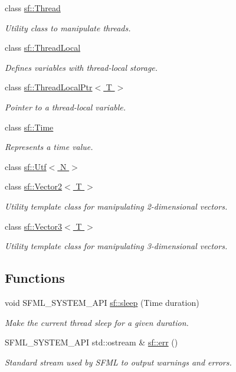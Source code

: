 \begin{DoxyCompactItemize}
class \hyperlink{classsf_1_1Thread}{sf\-::\-Thread}
\begin{DoxyCompactList}\small\item\em Utility class to manipulate threads. \end{DoxyCompactList}\item 
class \hyperlink{classsf_1_1ThreadLocal}{sf\-::\-Thread\-Local}
\begin{DoxyCompactList}\small\item\em Defines variables with thread-\/local storage. \end{DoxyCompactList}\item 
class \hyperlink{classsf_1_1ThreadLocalPtr}{sf\-::\-Thread\-Local\-Ptr$<$ T $>$}
\begin{DoxyCompactList}\small\item\em Pointer to a thread-\/local variable. \end{DoxyCompactList}\item 
class \hyperlink{classsf_1_1Time}{sf\-::\-Time}
\begin{DoxyCompactList}\small\item\em Represents a time value. \end{DoxyCompactList}\item 
class \hyperlink{classsf_1_1Utf}{sf\-::\-Utf$<$ N $>$}
\item 
class \hyperlink{classsf_1_1Vector2}{sf\-::\-Vector2$<$ T $>$}
\begin{DoxyCompactList}\small\item\em Utility template class for manipulating 2-\/dimensional vectors. \end{DoxyCompactList}\item 
class \hyperlink{classsf_1_1Vector3}{sf\-::\-Vector3$<$ T $>$}
\begin{DoxyCompactList}\small\item\em Utility template class for manipulating 3-\/dimensional vectors. \end{DoxyCompactList}\end{DoxyCompactItemize}
\subsection*{Functions}
\begin{DoxyCompactItemize}
\item 
void S\-F\-M\-L\-\_\-\-S\-Y\-S\-T\-E\-M\-\_\-\-A\-P\-I \hyperlink{group__system_ga2f2620831533dee0ed432ed982342e09}{sf\-::sleep} (Time duration)
\begin{DoxyCompactList}\small\item\em Make the current thread sleep for a given duration. \end{DoxyCompactList}\item 
S\-F\-M\-L\-\_\-\-S\-Y\-S\-T\-E\-M\-\_\-\-A\-P\-I std\-::ostream \& \hyperlink{group__system_ga7fe7f475639e26334606b5142c29551f}{sf\-::err} ()
\begin{DoxyCompactList}\small\item\em Standard stream used by S\-F\-M\-L to output warnings and errors. \end{DoxyCompactList}\end{DoxyCompactItemize}


